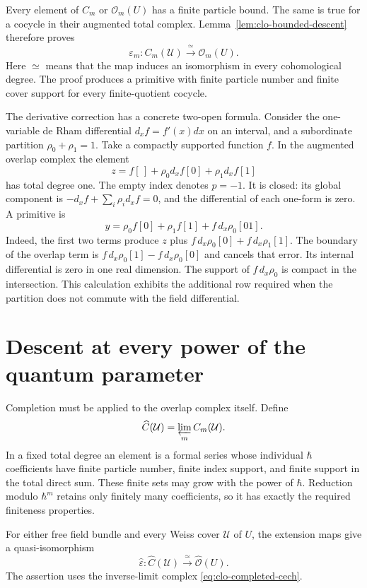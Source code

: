 Every element of $C_m$ or $\mathscr O_m(U)$ has a finite particle bound.
The same is true for a cocycle in their augmented total complex.
Lemma~\ref{lem:clo-bounded-descent} therefore proves
\[
 \varepsilon_m:C_m(\mathcal U)\xrightarrow{\ \simeq\ }
                  \mathscr O_m(U).
\]
Here $\simeq$ means that the map induces an isomorphism in every
cohomological degree.
The proof produces a primitive with finite particle number and finite
cover support for every finite-quotient cocycle.

The derivative correction has a concrete two-open formula.
Consider the one-variable de Rham differential $d_x f=f'(x)dx$ on an
interval, and a subordinate partition $\rho_0+\rho_1=1$.
Take a compactly supported function $f$.
In the augmented overlap complex the element
\[
 z=f[\,]+\rho_0d_xf[0]+\rho_1d_xf[1]
\]
has total degree one. The empty index denotes $p=-1$.
It is closed: its global component is $-d_xf+\sum_i\rho_i d_xf=0$,
and the differential of each one-form is zero.
A primitive is
\[
 y=\rho_0f[0]+\rho_1f[1]+f\,d_x\rho_0[01].
\]
Indeed, the first two terms produce $z$ plus
$f\,d_x\rho_0[0]+f\,d_x\rho_1[1]$.
The boundary of the overlap term is
$f\,d_x\rho_0[1]-f\,d_x\rho_0[0]$ and cancels that error.
Its internal differential is zero in one real dimension.
The support of $f\,d_x\rho_0$ is compact in the intersection.
This calculation exhibits the additional row required when the partition
does not commute with the field differential.

\section{Descent at every power of the quantum parameter}
\label{sec:clo-completed-descent}

Completion must be applied to the overlap complex itself. Define
\begin{equation}\label{eq:clo-completed-cech}
 \widehat C(\mathcal U)=\varprojlim_m C_m(\mathcal U).
\end{equation}
In a fixed total degree an element is a formal series whose individual
$\hbar$ coefficients have finite particle number, finite index support,
and finite support in the total direct sum.
These finite sets may grow with the power of $\hbar$.
Reduction modulo $\hbar^m$ retains only finitely many coefficients,
so it has exactly the required finiteness properties.

\begin{theorem}\label{thm:clo-completed-descent}
For either free field bundle and every Weiss cover $\mathcal U$ of $U$,
the extension maps give a quasi-isomorphism
\begin{equation}\label{eq:clo-descent-theorem}
 \widehat\varepsilon:\widehat C(\mathcal U)
        \xrightarrow{\ \simeq\ }\widehat{\mathscr O}(U).
\end{equation}
The assertion uses the inverse-limit complex
\eqref{eq:clo-completed-cech}.
\end{theorem}

